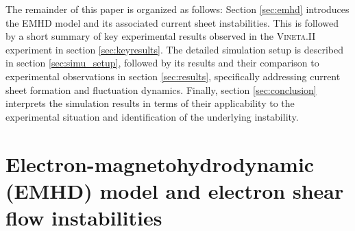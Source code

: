 \documentclass[aip,preprint]{revtex4-1}
\begin{document}

The remainder of this paper is organized as follows: Section \ref{sec:emhd} introduces the EMHD model and its associated current sheet instabilities. 
This is followed by a short summary of key experimental results observed in the \textsc{Vineta.II} experiment in section \ref{sec:keyresults}. The detailed simulation setup is described in section \ref{sec:simu_setup}, followed by its results and their comparison to experimental observations in section \ref{sec:results}, specifically addressing current sheet formation and fluctuation dynamics. Finally, section \ref{sec:conclusion} interprets the simulation results in terms of their applicability to the experimental situation and identification of the underlying instability.

\section{Electron-magnetohydrodynamic (EMHD) model and electron shear flow instabilities\label{sec:emhd}}
\end{document}
